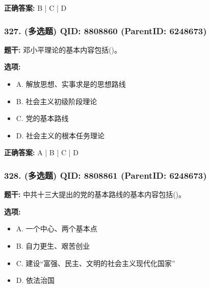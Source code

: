 \documentclass[12pt,UTF8]{ctexart}
\begin{document}
\textbf{正确答案:}
B | C | D

\vspace{0.3em}\hrulefill\vspace{0.7em}

\subsubsection*{327. (多选题) \small QID: 8808860 (ParentID: 6248673)}

\textbf{题干:}
邓小平理论的基本内容包括()。



\textbf{选项:}
\begin{itemize}[leftmargin=*]

  \item A. 解放思想、实事求是的思想路线

  \item B. 社会主义初级阶段理论

  \item C. 党的基本路线

  \item D. 社会主义的根本任务理论

\end{itemize}

\textbf{正确答案:}
A | B | C | D

\vspace{0.3em}\hrulefill\vspace{0.7em}

\subsubsection*{328. (多选题) \small QID: 8808861 (ParentID: 6248673)}

\textbf{题干:}
中共十三大提出的党的基本路线的基本内容包括()。



\textbf{选项:}
\begin{itemize}[leftmargin=*]

  \item A. 一个中心、两个基本点

  \item B. 自力更生、艰苦创业

  \item C. 建设“富强、民主、文明的社会主义现代化国家”

  \item D. 依法治国

\end{itemize}
\end{document}
